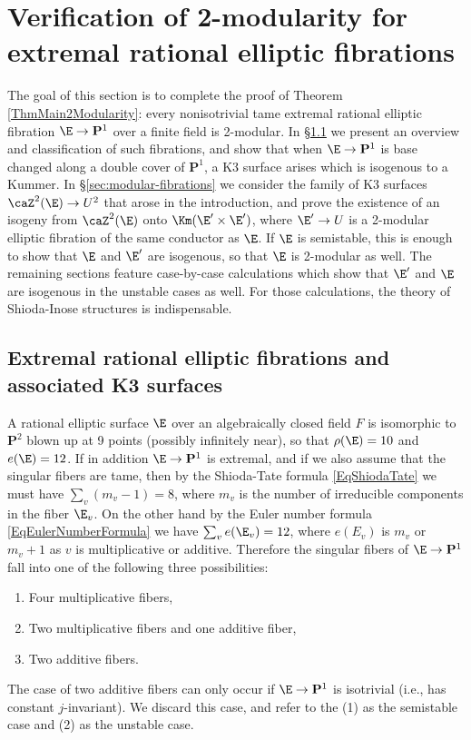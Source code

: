 \documentclass{article}
\def\P{\mathbf{P}}
\begin{document}
\section{Verification of 2-modularity for extremal rational elliptic fibrations}
\label{sec:verification}


The goal of this section is to complete the proof of Theorem \ref{ThmMain2Modularity}:  every nonisotrivial tame extremal rational elliptic fibration $\E\to\P^1$ over a finite field is 2-modular.  In \S\ref{sec:extremalrational} we present an overview and classification of such fibrations, and show that when $\E\to \P^1$ is base changed along a double cover of $\P^1$, a K3 surface arises which is isogenous to a Kummer.  In \S\ref{sec:modular-fibrations} we consider the family of K3 surfaces $\caZ^2(\E)\to U^2$ that arose in the introduction, and prove the existence of an isogeny from $\caZ^2(\E)$ onto $\Km(\E'\times \E')$, where $\E'\to U$ is a 2-modular elliptic fibration of the same conductor as $\E$.  If $\E$ is semistable, this is enough to show that $\E$ and $\E'$ are isogenous, so that $\E$ is 2-modular as well.  The remaining sections feature case-by-case calculations which show that $\E'$ and $\E$ are isogenous in the unstable cases as well.  For those calculations, the theory of Shioda-Inose structures is indispensable.  



\subsection{Extremal rational elliptic fibrations and associated K3 surfaces}
\label{sec:extremalrational}


A rational elliptic surface $\E$ over an algebraically closed field $F$  is isomorphic to $\P^2$ blown up at 9 points (possibly infinitely near), so that $\rho(\E)=10$ and $e(\E)=12$. If in addition $\E\to\P^1$ is extremal, and if we also assume that the singular fibers are tame, then by the Shioda-Tate formula \eqref{EqShiodaTate} we must have $\sum_v (m_v-1)=8$, where $m_v$ is the number of irreducible components in the fiber $\E_v$.  On the other hand by the Euler number formula \eqref{EqEulerNumberFormula} we have $\sum_v e(\E_v)=12$, where $e(E_v)$ is $m_v$ or $m_v+1$ as $v$ is multiplicative or additive.   Therefore the singular fibers of $\E\to\P^1$ fall into one of the following three possibilities:
\begin{enumerate}
\item Four multiplicative fibers,
\item Two multiplicative fibers and one additive fiber,
\item Two additive fibers.
\end{enumerate}
The case of two additive fibers can only occur if $\E\to \P^1$ is isotrivial (i.e., has constant $j$-invariant).  We discard this case, and refer to the (1) as the semistable case and (2) as the unstable case.
\end{document}

